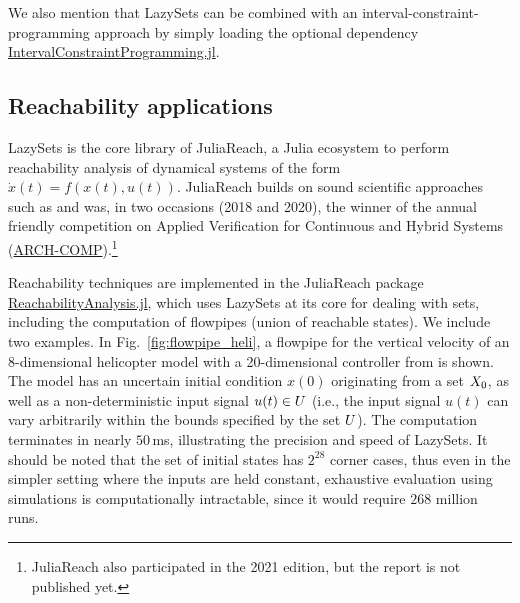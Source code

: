 \smallskip

We also mention that LazySets can be combined with an interval-constraint-programming approach by simply loading the optional dependency \href{https://github.com/JuliaIntervals/IntervalConstraintProgramming.jl}{IntervalConstraintProgramming.jl}.


\subsection{Reachability applications}\label{sec:reachability}

LazySets is the core library of JuliaReach, a Julia ecosystem to perform reachability analysis of dynamical systems of the form $\dot{x}(t) = f(x(t), u(t))$.
%
JuliaReach builds on sound scientific approaches such as \cite{BogomolovFFVPS18} and was, in two occasions (2018 and 2020), the winner of the annual friendly competition on Applied Verification for Continuous and Hybrid Systems (\href{https://cps-vo.org/group/ARCH}{ARCH-COMP}).\footnote{JuliaReach also participated in the 2021 edition, but the report is not published yet.}

\smallskip

Reachability techniques are implemented in the JuliaReach package \href{https://github.com/JuliaReach/ReachabilityAnalysis.jl}{ReachabilityAnalysis.jl}, which uses LazySets at its core for dealing with sets, including the computation of flowpipes (union of reachable states).
%
We include two examples. In Fig.~\ref{fig:flowpipe_heli}, a flowpipe for the vertical velocity of an 8-dimensional helicopter model with a 20-dimensional controller from \cite{skogestad2007multivariable} is shown.
%
The model has an uncertain initial condition $x(0)$ originating from a set $X_0$, as well as a non-deterministic input signal $u(t) \in U$ (i.e., the input signal $u(t)$ can vary arbitrarily within the bounds specified by the set $U$).
%
The computation terminates in nearly $50$\,ms, illustrating the precision and speed of LazySets.
%
It should be noted that the set of initial states has $2^{28}$ corner cases, thus even in the simpler setting where the inputs are held constant, exhaustive evaluation using simulations is computationally intractable, since it would require $268$ million runs.

\smallskip

